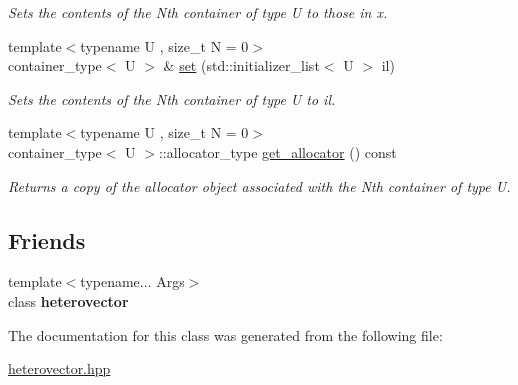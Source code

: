 \begin{DoxyCompactItemize}
\begin{DoxyCompactList}\small\item\em Sets the contents of the Nth container of type U to those in x. \end{DoxyCompactList}\item 
\hypertarget{classheterogeneous_1_1heterovector_3_01_t_00_01_types_8_8_8_4_a32a429d59ddabf75546d4cf2647c91c1}{}{\footnotesize template$<$typename U , size\+\_\+t N = 0$>$ }\\container\+\_\+type$<$ U $>$ \& \hyperlink{classheterogeneous_1_1heterovector_3_01_t_00_01_types_8_8_8_4_a32a429d59ddabf75546d4cf2647c91c1}{set} (std\+::initializer\+\_\+list$<$ U $>$ il)\label{classheterogeneous_1_1heterovector_3_01_t_00_01_types_8_8_8_4_a32a429d59ddabf75546d4cf2647c91c1}

\begin{DoxyCompactList}\small\item\em Sets the contents of the Nth container of type U to il. \end{DoxyCompactList}\item 
\hypertarget{classheterogeneous_1_1heterovector_3_01_t_00_01_types_8_8_8_4_a92ed25699b3dc08efeca249eb2f2c3cb}{}{\footnotesize template$<$typename U , size\+\_\+t N = 0$>$ }\\container\+\_\+type$<$ U $>$\+::allocator\+\_\+type \hyperlink{classheterogeneous_1_1heterovector_3_01_t_00_01_types_8_8_8_4_a92ed25699b3dc08efeca249eb2f2c3cb}{get\+\_\+allocator} () const \label{classheterogeneous_1_1heterovector_3_01_t_00_01_types_8_8_8_4_a92ed25699b3dc08efeca249eb2f2c3cb}

\begin{DoxyCompactList}\small\item\em Returns a copy of the allocator object associated with the Nth container of type U. \end{DoxyCompactList}\end{DoxyCompactItemize}
\subsection*{Friends}
\begin{DoxyCompactItemize}
\item 
\hypertarget{classheterogeneous_1_1heterovector_3_01_t_00_01_types_8_8_8_4_acd0092b47333ef1d1254476c1c3390c4}{}{\footnotesize template$<$typename... Args$>$ }\\class {\bfseries heterovector}\label{classheterogeneous_1_1heterovector_3_01_t_00_01_types_8_8_8_4_acd0092b47333ef1d1254476c1c3390c4}

\end{DoxyCompactItemize}


The documentation for this class was generated from the following file\+:\begin{DoxyCompactItemize}
\item 
\hyperlink{heterovector_8hpp}{heterovector.\+hpp}\end{DoxyCompactItemize}
